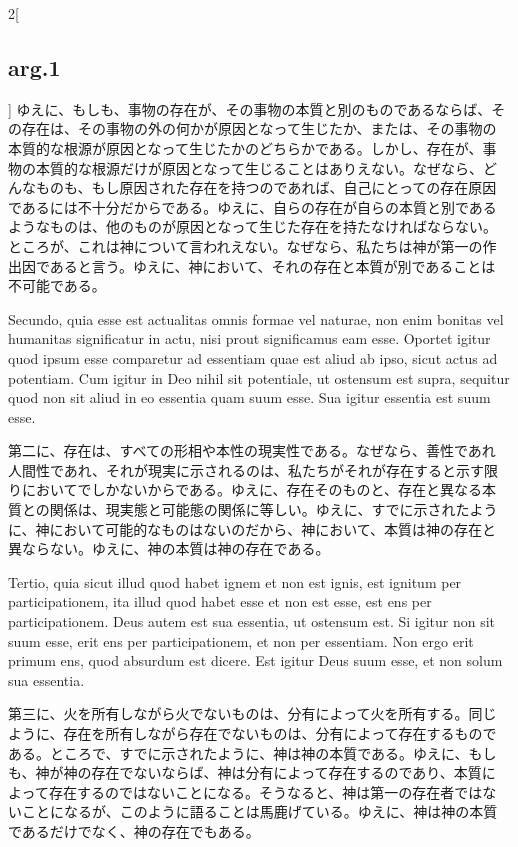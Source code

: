 \documentclass[paper=a4paper,fontsize=10pt,jafontsize=9pt,titlepage]{jlreq}
\begin{document}
\begin{paracol}{2}[\subsection{arg.1}]
ゆえに、もしも、事物の存在が、その事物の本質と別のものであるならば、そ
の存在は、その事物の外の何かが原因となって生じたか、または、その事物の
本質的な根源が原因となって生じたかのどちらかである。しかし、存在が、事
物の本質的な根源だけが原因となって生じることはありえない。なぜなら、ど
んなものも、もし原因された存在を持つのであれば、自己にとっての存在原因
であるには不十分だからである。ゆえに、自らの存在が自らの本質と別である
ようなものは、他のものが原因となって生じた存在を持たなければならない。
ところが、これは神について言われえない。なぜなら、私たちは神が第一の作
出因であると言う。ゆえに、神において、それの存在と本質が別であることは
不可能である。

\switchcolumn*

Secundo, quia esse est actualitas omnis formae vel naturae, non enim
bonitas vel humanitas significatur in actu, nisi prout significamus
eam esse.  Oportet igitur quod ipsum esse comparetur ad essentiam quae
est aliud ab ipso, sicut actus ad potentiam.  Cum igitur in Deo nihil
sit potentiale, ut ostensum est supra, sequitur quod non sit aliud in
eo essentia quam suum esse.  Sua igitur essentia est suum esse.

\switchcolumn

第二に、存在は、すべての形相や本性の現実性である。なぜなら、善性であれ
人間性であれ、それが現実に示されるのは、私たちがそれが存在すると示す限
りにおいてでしかないからである。ゆえに、存在そのものと、存在と異なる本
質との関係は、現実態と可能態の関係に等しい。ゆえに、すでに示されたよう
に、神において可能的なものはないのだから、神において、本質は神の存在と
異ならない。ゆえに、神の本質は神の存在である。

\switchcolumn*

Tertio, quia sicut illud quod habet ignem et non est ignis, est
ignitum per participationem, ita illud quod habet esse et non est
esse, est ens per participationem.  Deus autem est sua essentia, ut
ostensum est.  Si igitur non sit suum esse, erit ens per
participationem, et non per essentiam.  Non ergo erit primum ens, quod
absurdum est dicere.  Est igitur Deus suum esse, et non solum sua
essentia.

\switchcolumn

第三に、火を所有しながら火でないものは、分有によって火を所有する。同じ
ように、存在を所有しながら存在でないものは、分有によって存在するもので
ある。ところで、すでに示されたように、神は神の本質である。ゆえに、もし
も、神が神の存在でないならば、神は分有によって存在するのであり、本質に
よって存在するのではないことになる。そうなると、神は第一の存在者ではな
いことになるが、このように語ることは馬鹿げている。ゆえに、神は神の本質
であるだけでなく、神の存在でもある。


\end{paracol}
\end{document}

